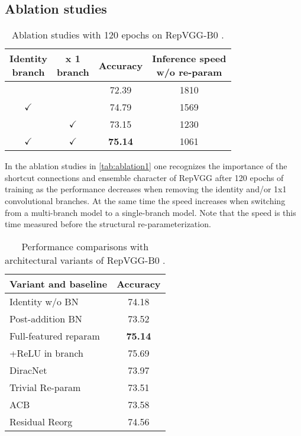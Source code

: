 \subsection{Ablation studies}

\begin{table}
	\begin{center}
		\begin{tabular}{cccc} 
			\hline
			\parbox[c][1cm]{1cm}{\centering Identity\\branch} & \parbox[c][1cm]{1cm}{ x 1\\branch} & \parbox[c][1cm]{1cm}{\centering Accuracy} & \parbox[c][1cm]{3cm}{\centering Inference speed\\w/o re-param} \\
			\hline
			 & & 72.39 & 1810 \\
			$\checkmark$ & & 74.79 & 1569 \\
			 & $\checkmark$ & 73.15 & 1230 \\
			$\checkmark$ & $\checkmark$ & \textbf{75.14} & 1061 \\
			\hline
		\end{tabular}
	\end{center}
	\caption{Ablation studies with 120 epochs on RepVGG-B0 \cite{XiaohanDing.2021}.}
	\label{tab:ablation1}
\end{table}

In the ablation studies in \autoref{tab:ablation1} one recognizes the importance of the shortcut connections and ensemble character of RepVGG after 120 epochs of training as the performance decreases when removing the identity and/or 1x1 convolutional branches. At the same time the speed increases when switching from a multi-branch model to a single-branch model. Note that the speed is this time measured before the structural re-parameterization. 

\begin{table}
	\begin{center}
		\begin{tabular}{lc} 
			\hline
			Variant and baseline & Accuracy \\
			\hline
			Identity w/o BN & 74.18 \\
			Post-addition BN & 73.52 \\
			Full-featured reparam & \textbf{75.14} \\
			+ReLU in branch & 75.69 \\
			\hline
			DiracNet \cite{SergeyZagoruyko.2018} & 73.97 \\
			Trivial Re-param & 73.51 \\
			ACB \cite{XiaohanDing.2019} & 73.58 \\
			Residual Reorg & 74.56 \\
			\hline
		\end{tabular}
	\end{center}
	\caption{Performance comparisons with architectural variants of RepVGG-B0 \cite{XiaohanDing.2021}.}
	\label{tab:ablation2}
\end{table}


